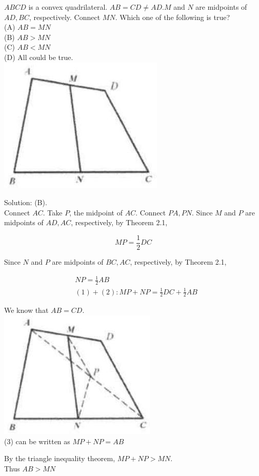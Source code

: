 \documentclass{article}
\begin{document}
\(A B C D\) is a convex quadrilateral. \(A B=C D \neq A D . M\) and \(N\) are midpoints of \(A D, B C\), respectively. Connect \(M N\). Which one of the following is true?\\
(A) \(A B=M N\)\\
(B) \(A B>M N\)\\
(C) \(A B<M N\)\\
(D) All could be true.\\
\centering
\includegraphics[width=\textwidth]{images/038.jpg}

Solution: (B).\\
Connect \(A C\). Take \(P\), the midpoint of \(A C\). Connect \(P A, P N\). Since \(M\) and \(P\) are midpoints of \(A D, A C\), respectively, by Theorem 2.1,

\[
M P=\frac{1}{2} D C
\]

Since \(N\) and \(P\) are midpoints of \(B C, A C\), respectively, by Theorem 2.1,

\[
\begin{aligned}
& N P=\frac{1}{2} A B \\
& (1)+(2): M P+N P=\frac{1}{2} D C+\frac{1}{2} A B
\end{aligned}
\]

We know that \(A B=C D\).\\
\centering
\includegraphics[width=\textwidth]{images/038(3).jpg}\\
(3) can be written as \(M P+N P=A B\)

By the triangle inequality theorem, \(M P+N P>M N\).\\
Thus \(A B>M N\)
\end{document}
